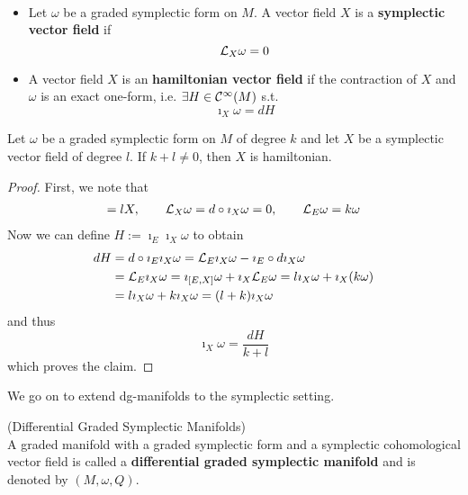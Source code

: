 \begin{definition}~
\begin{itemize}
  \item Let $\omega$ be a graded symplectic form on $M$. A vector field $X$ is a \textbf{symplectic vector field} if
  $$ \mathcal{L}_{X}\omega = 0 $$

  \item A vector field $X$ is an \textbf{hamiltonian vector field} if the contraction of $X$ and $\omega$ is an exact one-form, i.e. $\exists H \in \mathcal{C}^{\infty}(M)$ s.t.
  $$ \imath_X \omega = dH $$

\end{itemize}
\end{definition}

\begin{lem}
  Let $\omega$ be a graded symplectic form on $M$ of degree $k$ and let $X$ be a symplectic vector field of degree $l$. If $k+l \neq 0$, then $X$ is hamiltonian.

\begin{proof}
  First, we note that
  \begin{align}
    [E,X] = lX, \quad \quad \lie{X}\omega = d \circ \imath_X \omega = 0, \quad \quad \lie{E}\omega = k\omega
  \end{align}
  Now we can define $H:=\imath_E\imath_X \omega$ to obtain
  \begin{align}
    dH &= d \circ \imath_E\imath_X \omega = \mathcal{L}_{E}\imath_X\omega - \imath_E \circ d\imath_X\omega\\
    &= \mathcal{L}_{E}\imath_X \omega = \imath_{[E,X]} \omega + \imath_X \mathcal{L}_{E}\omega = l \imath_X\omega + \imath_X(k\omega)\\
    &= l \imath_X\omega + k \imath_X \omega = (l+k) \imath_X \omega
  \end{align}
  and thus
  $$ \imath_X\omega = \frac{dH}{k+l} $$
  which proves the claim.
\end{proof}
\end{lem}

We go on to extend dg-manifolds to the symplectic setting.

\begin{definition} (Differential Graded Symplectic Manifolds)\\
  A graded manifold with a graded symplectic form and a symplectic cohomological vector field is called a \textbf{differential graded symplectic manifold} and is denoted by $(M, \omega, Q)$.
\end{definition}

